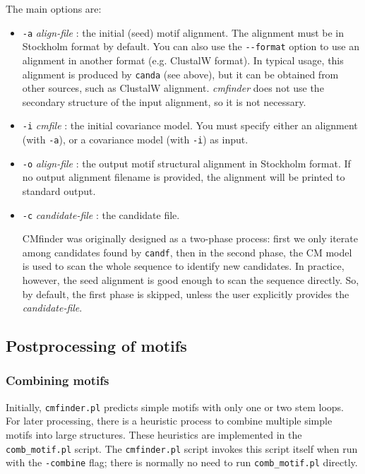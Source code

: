 \documentclass[letterpaper,12pt]{report}
\begin{document}
\noindent
The main options are:
\begin{itemize}
\item {\tt -a} {\it align-file} :  the initial (seed) motif alignment.
  The alignment must be in Stockholm format by default. You can also use the 
  {\tt -{}-format} option to use an alignment in another format (e.g. ClustalW format).
  In typical usage, this alignment is produced by {\tt canda} (see above), but it can be obtained from
  other sources, such as ClustalW alignment. 
  {\it cmfinder} does not use the secondary structure of the input alignment, so it is not necessary. 
\item {\tt -i} {\it cmfile} : the initial covariance model.
  You must specify either an alignment (with {\tt -a}), or a covariance model (with {\tt -i}) as input.
\item {\tt -o} {\it align-file} : the output motif structural alignment in Stockholm format. 
  If no output alignment filename is provided, the alignment will be printed to standard output.
\item {\tt -c} {\it candidate-file} : the candidate file.

CMfinder was originally designed as a two-phase process: first we only iterate among candidates 
  found by {\tt candf}, then in the second phase, the CM model is used to scan the whole sequence to 
  identify new candidates. In practice, however, the seed alignment is good enough to scan the 
  sequence directly. So, by default, the first phase is skipped, unless the user explicitly 
  provides the {\it candidate-file}. 
\end{itemize}

\subsection{Postprocessing of motifs}

\subsubsection{Combining motifs}

Initially, {\tt cmfinder.pl} predicts simple motifs with only one or two stem loops.  For later processing, there is a heuristic process to 
combine multiple simple motifs into large structures. These heuristics are implemented in the {\tt comb\_motif.pl} script.  The {\tt cmfinder.pl} script invokes this script itself when run with the {\tt -combine} flag; there is normally no need to run {\tt comb\_motif.pl} directly.
\end{document}
